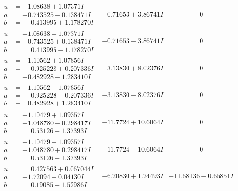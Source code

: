 \documentclass[1p]{elsarticle_modified}
\theoremstyle{definition}
\begin{document}
$$\begin{array}{c|c|c}
\begin{aligned}
u &= -1.08638 + 1.07371 I \\
a &= -0.743525 - 0.138471 I \\
b &= \phantom{-}0.413995 + 1.178270 I\end{aligned}
 & -0.71653 + 3.86741 I & \phantom{-0.000000 } 0 \\ \hline\begin{aligned}
u &= -1.08638 - 1.07371 I \\
a &= -0.743525 + 0.138471 I \\
b &= \phantom{-}0.413995 - 1.178270 I\end{aligned}
 & -0.71653 - 3.86741 I & \phantom{-0.000000 } 0 \\ \hline\begin{aligned}
u &= -1.10562 + 1.07856 I \\
a &= \phantom{-}0.925228 + 0.207336 I \\
b &= -0.482928 - 1.283410 I\end{aligned}
 & -3.13830 + 8.02376 I & \phantom{-0.000000 } 0 \\ \hline\begin{aligned}
u &= -1.10562 - 1.07856 I \\
a &= \phantom{-}0.925228 - 0.207336 I \\
b &= -0.482928 + 1.283410 I\end{aligned}
 & -3.13830 - 8.02376 I & \phantom{-0.000000 } 0 \\ \hline\begin{aligned}
u &= -1.10479 + 1.09357 I \\
a &= -1.048780 - 0.298417 I \\
b &= \phantom{-}0.53126 + 1.37393 I\end{aligned}
 & -11.7724 + 10.6064 I & \phantom{-0.000000 } 0 \\ \hline\begin{aligned}
u &= -1.10479 - 1.09357 I \\
a &= -1.048780 + 0.298417 I \\
b &= \phantom{-}0.53126 - 1.37393 I\end{aligned}
 & -11.7724 - 10.6064 I & \phantom{-0.000000 } 0 \\ \hline\begin{aligned}
u &= \phantom{-}0.427563 + 0.067044 I \\
a &= -1.72094 - 0.04130 I \\
b &= \phantom{-}0.19085 - 1.52986 I\end{aligned}
 & -6.20830 + 1.24493 I & -11.68136 - 0.65851 I\\

\end{array}$$
\end{document}
